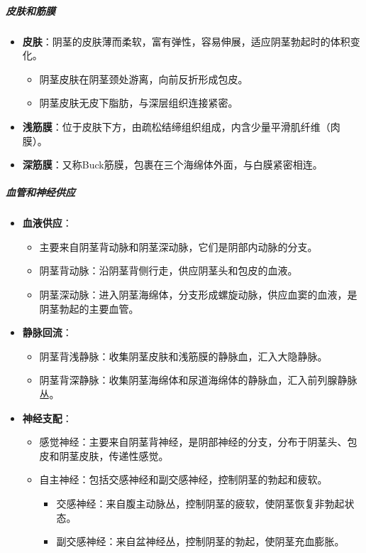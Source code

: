 \subparagraph{皮肤和筋膜}
\begin{itemize}
\item \textbf{皮肤}：阴茎的皮肤薄而柔软，富有弹性，容易伸展，适应阴茎勃起时的体积变化。
  \begin{itemize}
  \item 阴茎皮肤在阴茎颈处游离，向前反折形成包皮。
  \item 阴茎皮肤无皮下脂肪，与深层组织连接紧密。
  \end{itemize}
\item \textbf{浅筋膜}：位于皮肤下方，由疏松结缔组织组成，内含少量平滑肌纤维（肉膜）。
\item \textbf{深筋膜}：又称Buck筋膜，包裹在三个海绵体外面，与白膜紧密相连。
\end{itemize}

\subparagraph{血管和神经供应}

\begin{itemize}
\item \textbf{血液供应}：
  \begin{itemize}
  \item 主要来自阴茎背动脉和阴茎深动脉，它们是阴部内动脉的分支。
  \item 阴茎背动脉：沿阴茎背侧行走，供应阴茎头和包皮的血液。
  \item 阴茎深动脉：进入阴茎海绵体，分支形成螺旋动脉，供应血窦的血液，是阴茎勃起的主要血管。
  \end{itemize}
\item \textbf{静脉回流}：
  \begin{itemize}
  \item 阴茎背浅静脉：收集阴茎皮肤和浅筋膜的静脉血，汇入大隐静脉。
  \item 阴茎背深静脉：收集阴茎海绵体和尿道海绵体的静脉血，汇入前列腺静脉丛。
  \end{itemize}
\item \textbf{神经支配}：
  \begin{itemize}
  \item 感觉神经：主要来自阴茎背神经，是阴部神经的分支，分布于阴茎头、包皮和阴茎皮肤，传递性感觉。
  \item 自主神经：包括交感神经和副交感神经，控制阴茎的勃起和疲软。
    \begin{itemize}
    \item 交感神经：来自腹主动脉丛，控制阴茎的疲软，使阴茎恢复非勃起状态。
    \item 副交感神经：来自盆神经丛，控制阴茎的勃起，使阴茎充血膨胀。
    \end{itemize}
  \end{itemize}
\end{itemize}

